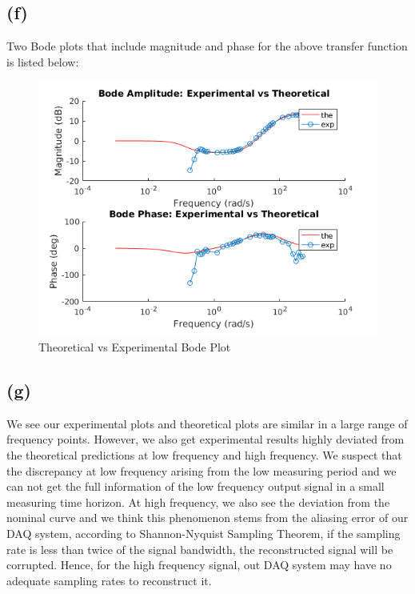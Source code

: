 \documentclass[letterpaper]{article}
\begin{document}
\subsection*{(f)}
Two Bode plots that include magnitude and phase for the above transfer function is listed below:
\begin{figure}[H]
	\centering
	\includegraphics[scale=1.0]{q1f_bode.png}
	\caption{Theoretical vs Experimental Bode Plot}
	\label{bode}
\end{figure}
\subsection*{(g)}
We see our experimental plots and theoretical plots are similar in a large range of frequency points. However, we also get experimental results highly deviated from the theoretical predictions at low frequency and high frequency. We suspect that the discrepancy at low frequency arising from the low measuring period and we can not get the full information of the low frequency output signal in a small measuring time horizon. At high frequency, we also see the deviation from the nominal curve and we think this phenomenon stems from the aliasing error of our DAQ system, according to Shannon-Nyquist Sampling Theorem, if the sampling rate is less than twice of the signal bandwidth, the reconstructed signal will be corrupted. Hence, for the high frequency signal, out DAQ system may have no adequate sampling rates to reconstruct it.
\end{document}
